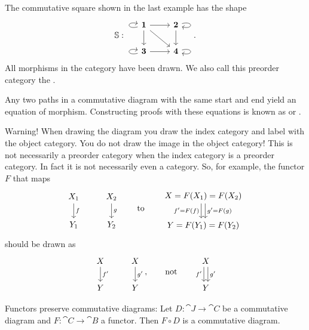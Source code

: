 \begin{example}
The commutative square shown in the last example has the shape
\[ \mathbb{S}: \begin{tikzcd}
\boldsymbol{1} \ar[loop left] \ar[r] \ar[dr] \ar[d] & \boldsymbol{2} \ar[d] \ar[loop right] \\
\boldsymbol{3} \ar[loop left] \ar[r] & \boldsymbol{4} \ar[loop right]
\end{tikzcd}. \]
All morphisms in the category have been drawn. We also call this preorder category the .
\end{example}

Any two paths in a commutative diagram with the same start and end yield an equation of morphism. Constructing proofs with these equations is known as  or .

\begin{example}
Warning! When drawing the diagram you draw the index category and label with the object category. You do not draw the image in the object category! This is not necessarily a preorder category when the index category is a preorder category. In fact it is not necessarily even a category. So, for example, the functor $F$ that maps
\[ \begin{tikzcd}
X_1 \dar{f} & X_2 \dar{g} \\ Y_1 & Y_2
\end{tikzcd} \qquad\text{to}\qquad \begin{tikzcd}
X = F(X_1) = F(X_2) \ar[d, shift right, swap, "f' = F(f)"] \ar[d, shift left, "g' = F(g)"] \\ Y = F(Y_1) = F(Y_2)
\end{tikzcd}  \]
should be drawn as
\[ \begin{tikzcd}
X \dar{f'} & X \dar{g'} \\ Y & Y
\end{tikzcd}, \qquad\text{not}\qquad \begin{tikzcd}
X \ar[d, swap, shift right, "f'"] \ar[d, shift left, "g'"] \\ Y
\end{tikzcd} \]
\end{example}

\begin{lemma}
Functors preserve commutative diagrams: Let $D:\cat{J}\to \cat{C}$ be a commutative diagram and $F:\cat{C}\to \cat{B}$ a functor. Then $F\circ D$ is a commutative diagram.
\end{lemma}

